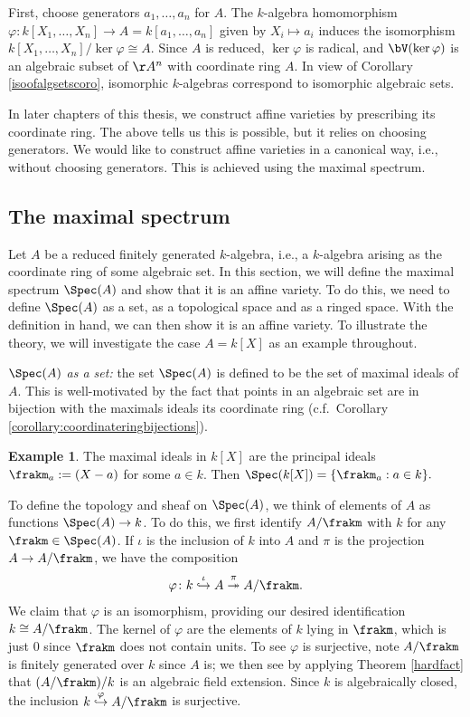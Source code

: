 \documentclass[12pt]{amsart}
\theoremstyle{plain}
\theoremstyle{definition}
\newtheorem{example}[theorem]{Example}
\begin{document}
First, choose generators $a_1, \ldots, a_n$ for $A$.
The $k$-algebra homomorphism $\varphi : k[X_1, \ldots, X_n] \to A=k[a_1,\ldots,a_n]$ given by $X_i \mapsto a_i$ induces the isomorphism $k[X_1, \ldots, X_n] / \ker \varphi \cong A$.
Since $A$ is reduced, $\ker\varphi$ is radical, and $\bV(\ker \varphi)$ is an algebraic subset of $\AA^n$ with coordinate ring $A$.
In view of Corollary \ref{isoofalgsetscoro}, isomorphic $k$-algebras correspond to isomorphic algebraic sets.

In later chapters of this thesis, we construct affine varieties by prescribing its coordinate ring.
The above tells us this is possible, but it relies on choosing generators.
We would like to construct affine varieties in a canonical way, i.e., without choosing generators.
This is achieved using the maximal spectrum.





\subsection{The maximal spectrum}\label{section:themaximalspectrum}
Let $A$ be a reduced finitely generated $k$-algebra, i.e., a $k$-algebra arising as the coordinate ring of some algebraic set.
In this section, we will define the maximal spectrum $\Spec(A)$ and show that it is an affine variety.
To do this, we need to define $\Spec(A)$ as a set, as a topological space and as a ringed space.
With the definition in hand, we can then show it is an affine variety.
To illustrate the theory, we will investigate the case $A=k[X]$ as an example throughout.

\emph{$\Spec(A)$ as a set:}
the set $\Spec(A)$ is defined to be the set of maximal ideals of $A$.
This is well-motivated by the fact that points in an algebraic set are in bijection with the maximals ideals its coordinate ring (c.f.\ Corollary \ref{corollary:coordinateringbijections}).

\begin{example}
The maximal ideals in $k[X]$ are the principal ideals $\frakm_a:=(X-a)$ for some $a\in k$.
Then $\Spec(k[X]) = \{\frakm_a : a \in k\}.$
\end{example}

To define the topology and sheaf on $\Spec(A)$, we think of elements of $A$ as functions $\Spec(A) \to k$.
To do this, we first identify $A/\frakm$ with $k$ for any $\frakm \in \Spec(A)$.
If $\iota$ is the inclusion of $k$ into $A$ and $\pi$ is the projection $A \to A/\frakm$, we have the composition
$$\varphi \colon k \overset{\iota}{\hookrightarrow} A \overset{\pi}{\twoheadrightarrow} A/\frakm.$$
We claim that $\varphi$ is an isomorphism, providing our desired identification $k \cong A/\frakm$.
The kernel of $\varphi$ are the elements of $k$ lying in $\frakm$, which is just $0$ since $\frakm$ does not contain units.
To see $\varphi$ is surjective, note $A/\frakm$ is finitely generated over $k$ since $A$ is;
we then see by applying Theorem \ref{hardfact} that $(A/\frakm)/k$ is an algebraic field extension.
Since $k$ is algebraically closed, the inclusion $k \overset{\varphi}{\hookrightarrow} A/\frakm$ is surjective.
\end{document}
